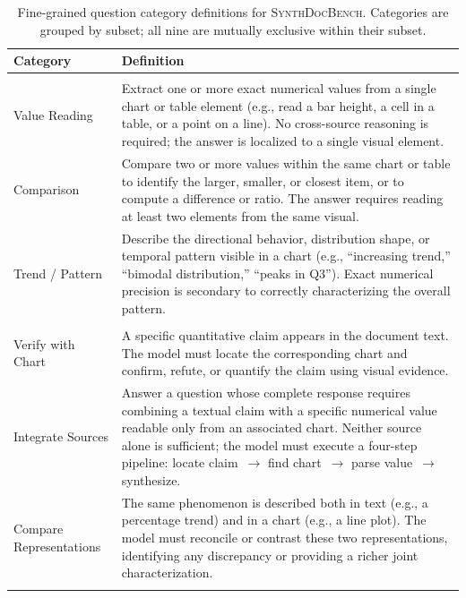 \documentclass{article} %
\newcommand{\synthdocbench}[1]{\textsc{SynthDocBench}}
\begin{document}
\begin{table}[htbp]
\centering
\footnotesize
\caption{%
  Fine-grained question category definitions for \synthdocbench{}.
  Categories are grouped by subset; all nine are mutually exclusive within their subset.
}
\label{tab:question_taxonomy}
\begin{tabular}{@{}lp{10.5cm}@{}}
\toprule
\textbf{Category} & \textbf{Definition} \\
\midrule
\rowcolor{gray!15} \multicolumn{2}{c}{\textit{Chart Reading}} \\
\midrule
Value Reading &
  Extract one or more exact numerical values from a single chart or table element
  (e.g., read a bar height, a cell in a table, or a point on a line). No cross-source
  reasoning is required; the answer is localized to a single visual element. \\[4pt]
Comparison &
  Compare two or more values within the same chart or table to identify the larger,
  smaller, or closest item, or to compute a difference or ratio. The answer requires
  reading at least two elements from the same visual. \\[4pt]
Trend / Pattern &
  Describe the directional behavior, distribution shape, or temporal pattern visible
  in a chart (e.g., ``increasing trend,'' ``bimodal distribution,'' ``peaks in Q3'').
  Exact numerical precision is secondary to correctly characterizing the overall pattern. \\
\midrule
\rowcolor{gray!15} \multicolumn{2}{c}{\textit{Cross-Modal}} \\
\midrule
Verify with Chart &
  A specific quantitative claim appears in the document text. The model must locate
  the corresponding chart and confirm, refute, or quantify the claim using visual evidence. \\[4pt]
Integrate Sources &
  Answer a question whose complete response requires combining a textual claim with a
  specific numerical value readable only from an associated chart. Neither source alone
  is sufficient; the model must execute a four-step pipeline: locate claim~$\to$ find
  chart~$\to$ parse value~$\to$ synthesize. \\[4pt]
Compare Representations &
  The same phenomenon is described both in text (e.g., a percentage trend) and in a
  chart (e.g., a line plot). The model must reconcile or contrast these two representations,
  identifying any discrepancy or providing a richer joint characterization. \\
\midrule
\rowcolor{gray!15} \multicolumn{2}{c}{\textit{Complex Reasoning}} \\

\end{tabular}
\end{table}
\end{document}
